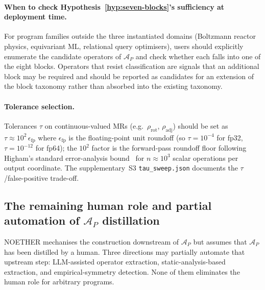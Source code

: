 \documentclass[manuscript]{acmart}
\begin{document}
\paragraph{When to check Hypothesis~\ref{hyp:seven-blocks}'s sufficiency at deployment time.} For program families outside the three instantiated domains (Boltzmann reactor physics, equivariant ML, relational query optimisers), users should explicitly enumerate the candidate operators of $\mathcal{A}_P$ and check whether each falls into one of the eight blocks. Operators that resist classification are signals that an additional block may be required and should be reported as candidates for an extension of the block taxonomy rather than absorbed into the existing taxonomy.

\paragraph{Tolerance selection.} Tolerances $\tau$ on continuous-valued MRs (e.g.\ $\rho_{\mathrm{rot}}$, $\rho_{\mathrm{adj}}$) should be set as $\tau \approx 10^{2}\, \epsilon_{\mathrm{fp}}$ where $\epsilon_{\mathrm{fp}}$ is the floating-point unit roundoff (so $\tau = 10^{-4}$ for fp32, $\tau = 10^{-12}$ for fp64); the $10^{2}$ factor is the forward-pass roundoff floor following Higham's standard error-analysis bound~\cite{Higham2002Accuracy} for $n \approx 10^{3}$ scalar operations per output coordinate. The supplementary~S3 \texttt{tau\_sweep.json} documents the $\tau$/false-positive trade-off.

\subsection{The remaining human role and partial automation of \texorpdfstring{$\mathcal{A}_P$}{A\_P} distillation}
\label{subsec:remaining-human-role}

NOETHER mechanises the construction downstream of $\mathcal{A}_P$ but assumes that $\mathcal{A}_P$ has been distilled by a human. Three directions may partially automate that upstream step: LLM-assisted operator extraction, static-analysis-based extraction, and empirical-symmetry detection. None of them eliminates the human role for arbitrary programs.
\end{document}
